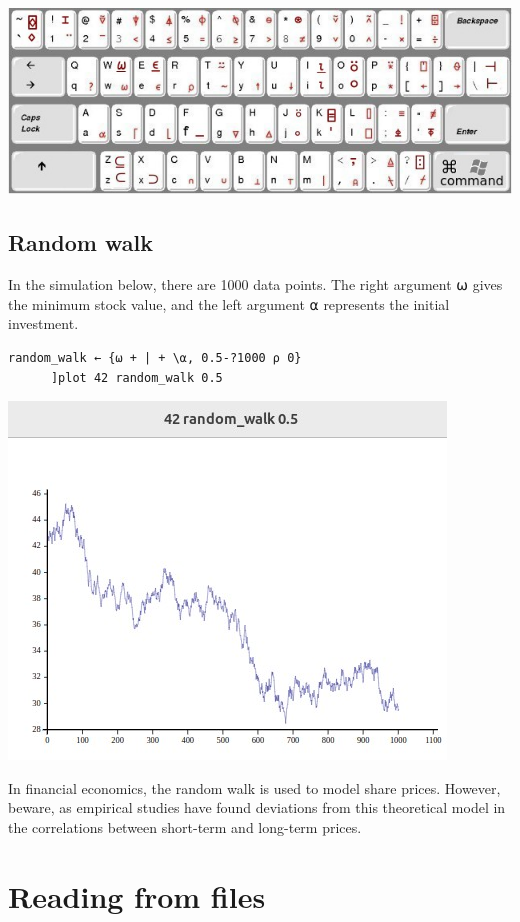 \documentclass[a4paper,12pt]{book}
\begin{document}
\newpage
\includegraphics[width=15cm]{figs/apl-keyboard.jpg}

\section{Random walk}
In the simulation below, there are 1000 data points.
The right argument ⍵ gives the minimum stock value,
and the left argument ⍺ represents the initial investment.

\begin{lstlisting}[language=apl]
random_walk ← {⍵ + | + \⍺, 0.5-?1000 ⍴ 0}
      ]plot 42 random_walk 0.5
\end{lstlisting}

\includegraphics{srcfigs/random-walk.jpg}

In financial economics, the random walk
is used to model share prices. However, beware,
as empirical studies have found deviations
from this theoretical model in the correlations
between short-term and long-term prices.

\chapter{Reading from files}\large
\end{document}

